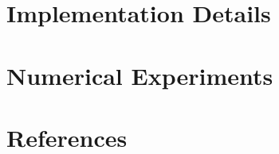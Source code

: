 \documentclass[3p, 11pt]{elsarticle}
\begin{document}
%

\section{Implementation Details}\label{section:implementation}


\section{Numerical Experiments}\label{section:numerical}


\clearpage
\section*{References}
	
	
	
\end{document}
